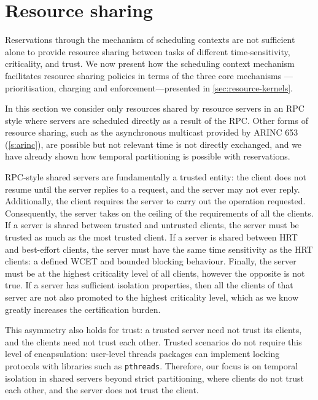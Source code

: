\section{Resource sharing}\label{s:locking}

Reservations through the mechanism of scheduling contexts are not sufficient alone to provide
resource sharing between tasks of different time-sensitivity, criticality, and trust. We now
present how the scheduling context mechanism facilitates resource sharing policies 
in terms of the three core mechanisms ---prioritisation, charging and enforcement---presented 
in \cref{sec:resource-kernels}.

In this section we consider only resources shared by resource servers in an \gls{RPC} style where
servers are scheduled directly as a result of the \gls{RPC}. Other forms of resource sharing, such
as the asynchronous multicast provided by ARINC 653 (\cref{s:arinc}), are possible but not relevant
time is not directly exchanged, and we have already shown how temporal partitioning is possible with
reservations. 

RPC-style shared servers are fundamentally a trusted entity: the client does not resume until the
server replies to a request, and the server may not ever reply. Additionally, the client requires the
server to carry out the operation requested. Consequently, the server takes on the ceiling of the
requirements of all the clients. If a server is shared between trusted and untrusted clients, the
server must be trusted as much as the most trusted client. If a server is shared between \gls{HRT}
and best-effort clients, the server must have the same time sensitivity as the HRT clients: a defined 
\gls{WCET} and bounded blocking behaviour. Finally, the server must be at the highest criticality
level of all clients, however the opposite is not true. If a server has sufficient isolation
properties, then all the clients of that server are not also promoted to the
highest criticality level, which as we know greatly increases the certification burden. 

This asymmetry also holds for trust: a trusted server need not trust its clients,
and the clients need not trust each other. 
Trusted scenarios do not require this level of encapsulation: user-level threads packages can implement
locking protocols with libraries such as \texttt{pthreads}. Therefore, our focus is on temporal
isolation in shared servers beyond strict partitioning, where clients do not trust each other, and
the server does not trust the client.

